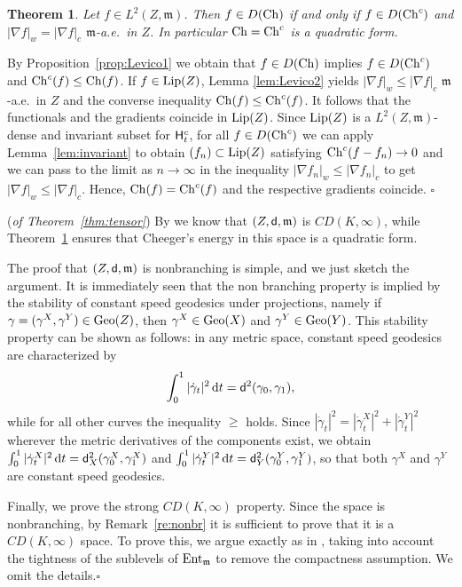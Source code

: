 \documentclass[reqno,11pt]{article}
\numberwithin{equation}{section}
\newcommand{\C}{\mathbb{C}}
\newcommand{\mm}{{\mbox{\boldmath$m$}}}
\newcommand{\sfd}{{\sf d}}
\renewcommand{\d}{{\mathrm d}}
\newenvironment{proof}{\removelastskip\par\medskip   %
\noindent{\em Proof.}
\rm}{\penalty-20\null\hfill$\square$\par\medbreak}
\newtheorem{theorem}{Theorem}[section]
\newcommand{\entv}{{\rm Ent}_{\mm}}                    %
\newcommand{\geo}{{\rm{Geo}}}                       %
\newcommand{\weakgrad}[1]{|\nabla #1|_w}                %
\newcommand{\cartgrad}[1]{|\nabla #1|_c}
\renewcommand{\C}{{\rm Ch}}
\newcommand{\heatl}{{\sf H}}
\renewcommand{\mm}{\mathfrak m}
\begin{document}
%
\begin{theorem}\label{thm:tensorquadratic}
Let $f\in L^2(Z,\mm)$. Then $f\in D(\C)$ if and only if $f\in
D(\C^c)$ and $\weakgrad{f}=\cartgrad{f}$ $\mm$-a.e.~in $Z$. In
particular $\C=\C^c$ is a quadratic form.
\end{theorem}
\begin{proof} By Proposition~\ref{prop:Levico1} we obtain that $f\in D(\C)$
implies $f\in D(\C^c)$ and $\C^c(f)\leq\C(f)$. If $f\in {\rm
Lip}(Z)$, Lemma \ref{lem:Levico2} yields $\weakgrad f\leq\cartgrad
f$ $\mm$-a.e.~in $Z$ and the converse inequality $\C(f)\leq\C^c(f)$.
It follows that the functionals and the gradients coincide in ${\rm
Lip}(Z)$. Since ${\rm Lip}(Z)$ is a $L^2(Z,\mm)$-dense and invariant
subset for $\heatl_t^c$, for all $f\in D(\C^c)$ we can apply
Lemma~\ref{lem:invariant} to obtain $(f_n)\subset {\rm Lip}(Z)$
satisfying $\C^c(f-f_n)\to 0$ and we can pass to the limit as
$n\to\infty$ in the inequality $\weakgrad{f_n}\leq\cartgrad{f_n}$ to
get $\weakgrad{f}\leq\cartgrad{f}$. Hence, $\C(f)=\C^c(f)$ and the
respective gradients coincide.
\end{proof}

\begin{proof} (\emph{of Theorem~\ref{thm:tensor}}) By \cite[Proposition~4.16]{Sturm06I}
we know that $(Z,\sfd,\mm)$ is $CD(K,\infty)$, while
Theorem~\ref{thm:tensorquadratic} ensures that Cheeger's energy in
this space is a quadratic form.

The proof that $(Z,\sfd,\mm)$ is nonbranching is simple, and we just
sketch the argument. It is immediately seen that the non branching
property is implied by the stability of constant speed geodesics
under projections, namely if $\gamma=(\gamma^X,\gamma^Y)\in\geo(Z)$,
then $\gamma^X\in\geo(X)$ and $\gamma^Y\in\geo(Y)$. This stability
property can be shown as follows: in any metric space, constant
speed geodesics are characterized by
$$
\int_0^1|\dot\gamma_t|^2\,\d t= \sfd^2(\gamma_0,\gamma_1),
$$
while for all other curves the inequality $\geq$ holds. Since
$|\dot\gamma_t|^2=|\dot\gamma^X_t|^2+|\dot\gamma^Y_t|^2$ wherever
the metric derivatives of the components exist, we obtain
$\int_0^1|\dot\gamma_t^X|^2\,\d t= \sfd^2_X(\gamma^X_0,\gamma^X_1)$
and $\int_0^1|\dot\gamma^Y_t|^2\,\d t=
\sfd^2_Y(\gamma^Y_0,\gamma^Y_1)$, so that both $\gamma^X$ and
$\gamma^Y$ are constant speed geodesics.

Finally, we prove the strong $CD(K,\infty)$ property. Since the
space is nonbranching, by Remark~\ref{re:nonbr} it is sufficient to
prove that it is a $CD(K,\infty)$ space. To prove this, we argue
exactly as in \cite[Lemma 4.7 and Proposition 4.16]{Sturm06I},
taking into account the tightness of the sublevels of $\entv$ to
remove the compactness assumption. We omit the details.\end{proof}
\end{document}
